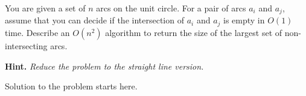 \documentclass{article}
\begin{document}
\begin{question}
You are given a set of $n$ arcs on the unit circle. For a pair of arcs $a_i$ and $a_j$, assume that you can decide if the intersection of $a_i$ and $a_j$ is empty in $O(1)$ time. Describe an $O(n^2)$ algorithm to return the size of the largest set of non-intersecting arcs.

{\bfseries Hint.} {\em Reduce the problem to the straight line version.}
\end{question}

\begin{solution}
Solution to the problem starts here.
\end{solution}
\end{document}
